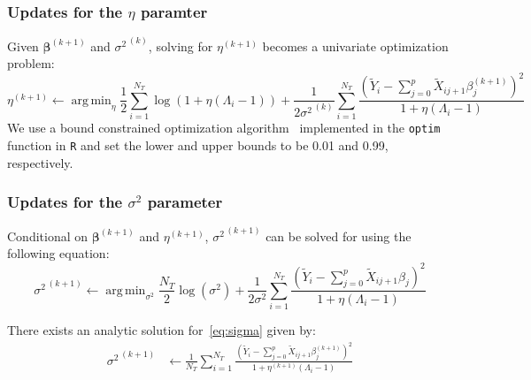 \documentclass[12pt,letter]{article}\usepackage[]{graphicx}\usepackage[]{color}
\newcommand{\Xtilde}{\widetilde{X}}
\newcommand{\Ytilde}{\widetilde{Y}}
\newcommand{\bTheta}{\boldsymbol{\Theta}}
\newcommand{\bbeta}{\boldsymbol{\beta}}
\DeclareMathOperator*{\argmin}{arg\,min}
\begin{document}

\subsubsection{Updates for the $\eta$ paramter}
Given $\bbeta^{(k+1)}$ and ${\sigma^2}^{\,(k)}$, solving for $\eta^{(k+1)}$ becomes a univariate optimization problem:
\begin{equation}
	\eta^{(k+1)} \leftarrow \argmin_{\eta}  \frac{1}{2} \sum_{i=1}^{N_T} \log(1 + \eta (\Lambda_i-1)) + \frac{1}{2{\sigma^2}^{\,(k)}} \sum_{i=1}^{N_T}\frac{\left(  \Ytilde_i - \sum_{j=0}^{p}\Xtilde_{ij+1}\beta_j^{(k+1)} \right) ^2}{1 + \eta (\Lambda_i-1)}
\end{equation}
We use a bound constrained optimization algorithm~\citep{byrd1995limited} implemented in the \texttt{optim} function in \texttt{R} and set the lower and upper bounds to be 0.01 and 0.99, respectively.



\subsubsection{Updates for the $\sigma^2$ parameter}

Conditional on $\bbeta^{(k+1)}$ and $\eta^{(k+1)}$, ${\sigma^2}^{\,(k+1)}$ can be solved for using the following equation:
\begin{equation}
	{\sigma^2}^{\,(k+1)} \leftarrow \argmin_{\sigma^2}  \frac{N_T}{2}\log(\sigma^2) + \frac{1}{2\sigma^2} \sum_{i=1}^{N_T}\frac{\left(  \Ytilde_i - \sum_{j=0}^{p}\Xtilde_{ij+1}\beta_j \right) ^2}{1 + \eta (\Lambda_i-1)} \label{eq:sigma}
\end{equation}

There exists an analytic solution for~\eqref{eq:sigma} given by:
\begin{align}
	{\sigma^2}^{\,(k+1)} & \gets \frac{1}{N_T}\sum_{i=1}^{N_T}\frac{\left(  \Ytilde_i - \sum_{j=0}^{p}\Xtilde_{ij+1}\beta_j^{(k+1)} \right) ^2}{1 + \eta^{(k+1)} (\Lambda_i-1)} \label{eq:sigmahat2}
\end{align}
\end{document}
